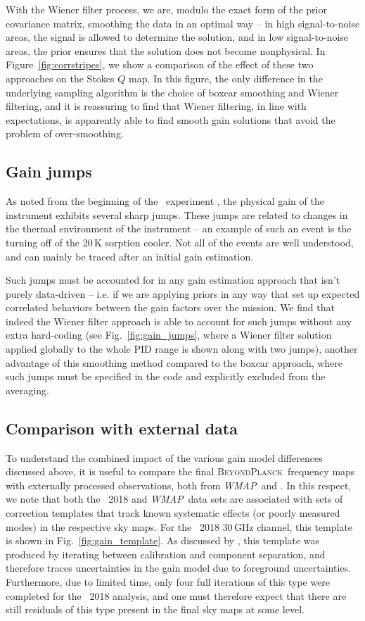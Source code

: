 \documentclass[twocolumn]{aa}
\def\WMAP{\textit{WMAP}}
\newcommand{\BP}{\textsc{BeyondPlanck}}
\begin{document}
With the Wiener filter process, we are, modulo the exact form of the prior covariance matrix, smoothing the data in an optimal way -- in high signal-to-noise areas, the signal is allowed to determine the solution, and in low signal-to-noise areas, the prior ensures that the solution does not become nonphysical. In Figure~\ref{fig:corrstripes}, we show a comparison of the effect of these two approaches on the Stokes $Q$ map. In this figure, the only difference in the underlying sampling algorithm is the choice of boxcar smoothing and Wiener filtering, and it is reassuring to find that Wiener filtering, in line with expectations, is apparently able to find smooth gain solutions that avoid the problem of over-smoothing.

\subsection{Gain jumps}
\label{sec:gainjumps}
As noted from the beginning of the \Planck\ experiment \citep[see, e.g.,][]{planck2013-p05}, the physical gain of the instrument exhibits several sharp jumps. These jumps are related to changes in the thermal environment of the instrument -- an example of such an event is the turning off of the 20\,K sorption cooler. Not all of the events are well understood, and can mainly be traced after an initial gain estimation.

Such jumps must be accounted for in any gain estimation approach that isn't purely data-driven -- i.e. if we are applying priors in any way that set up expected correlated behaviors between the gain factors over the mission. We find that indeed the Wiener filter approach is able to account for such jumps without any extra hard-coding (see Fig.~\ref{fig:gain_jumps}, where a Wiener filter solution applied globally to the whole PID range is shown along with two jumps), another advantage of this smoothing method compared to the boxcar approach, where such jumps must be specified in the code and explicitly excluded from the averaging.

\subsection{Comparison with external data}
\label{sec:external}

To understand the combined impact of the various gain model
differences discussed above, it is useful to compare the final
\BP\ frequency maps with externally processed observations, both from
\WMAP\ and \Planck. In this respect, we note that both the
\Planck\ 2018 and \WMAP\ data sets are associated with sets of
correction templates that track known systematic effects (or poorly
measured modes) in the respective sky maps. For the \Planck\ 2018
30\,GHz channel, this template is shown in
Fig.~\ref{fig:gain_template}. As discussed by \citet{planck2016-l02},
this template was produced by iterating between calibration and
component separation, and therefore traces uncertainties in the gain
model due to foreground uncertainties. Furthermore, due to limited
time, only four full iterations of this type were completed for the
\Planck\ 2018 analysis, and one must therefore expect that there are
still residuals of this type present in the final sky maps at some
level.
\end{document}
